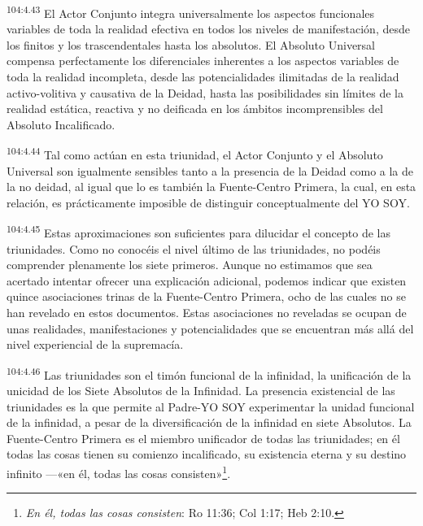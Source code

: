 \par
\textsuperscript{104:4.43} El Actor Conjunto integra universalmente los aspectos funcionales variables de toda la realidad efectiva en todos los niveles de manifestación, desde los finitos y los trascendentales hasta los absolutos. El Absoluto Universal compensa perfectamente los diferenciales inherentes a los aspectos variables de toda la realidad incompleta, desde las potencialidades ilimitadas de la realidad activo-volitiva y causativa de la Deidad, hasta las posibilidades sin límites de la realidad estática, reactiva y no deificada en los ámbitos incomprensibles del Absoluto Incalificado.

\par
\textsuperscript{104:4.44} Tal como actúan en esta triunidad, el Actor Conjunto y el Absoluto Universal son igualmente sensibles tanto a la presencia de la Deidad como a la de la no deidad, al igual que lo es también la Fuente-Centro Primera, la cual, en esta relación, es prácticamente imposible de distinguir conceptualmente del YO SOY.

\par
\textsuperscript{104:4.45} Estas aproximaciones son suficientes para dilucidar el concepto de las triunidades. Como no conocéis el nivel último de las triunidades, no podéis comprender plenamente los siete primeros. Aunque no estimamos que sea acertado intentar ofrecer una explicación adicional, podemos indicar que existen quince asociaciones trinas de la Fuente-Centro Primera, ocho de las cuales no se han revelado en estos documentos. Estas asociaciones no reveladas se ocupan de unas realidades, manifestaciones y potencialidades que se encuentran más allá del nivel experiencial de la supremacía.

\par
\textsuperscript{104:4.46} Las triunidades son el timón funcional de la infinidad, la unificación de la unicidad de los Siete Absolutos de la Infinidad. La presencia existencial de las triunidades es la que permite al Padre-YO SOY experimentar la unidad funcional de la infinidad, a pesar de la diversificación de la infinidad en siete Absolutos. La Fuente-Centro Primera es el miembro unificador de todas las triunidades; en él todas las cosas tienen su comienzo incalificado, su existencia eterna y su destino infinito ---«en él, todas las cosas consisten»\footnote{\textit{En él, todas las cosas consisten}: Ro 11:36; Col 1:17; Heb 2:10.}.


